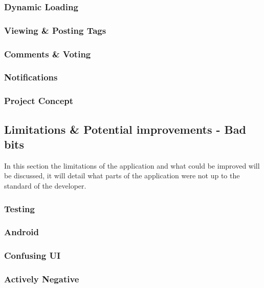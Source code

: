 \subsubsection{Dynamic Loading}

\subsubsection{Viewing \& Posting Tags}

\subsubsection{Comments \& Voting}

\subsubsection{Notifications}

\subsubsection{Project Concept}


\subsection{Limitations \& Potential improvements - Bad bits}

In this section the limitations of the application and what could be improved will be discussed, it will detail what parts of the application were not up to the standard of the developer.

\subsubsection{Testing}

\subsubsection{Android}


\subsubsection{Confusing UI}

\subsubsection{Actively Negative}

